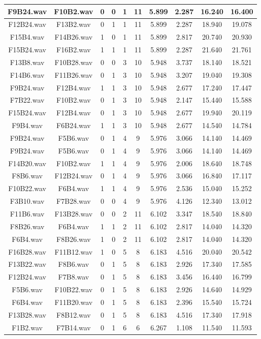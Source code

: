 \documentclass[11pt,a4paper]{book}
\begin{document}
\begin{longtable}[c]{|c|c|c|c|c|c|c|c|c|c|}
F9B24.wav&F10B2.wav&0&0&1&11&5.899&2.287&16.240&16.400\\ \hline
F12B24.wav&F13B2.wav&0&1&1&11&5.899&2.287&18.940&19.078\\ \hline
F15B4.wav&F14B26.wav&1&0&1&11&5.899&2.817&20.740&20.930\\ \hline
F15B24.wav&F16B2.wav&1&1&1&11&5.899&2.287&21.640&21.761\\ \hline
F13B8.wav&F10B28.wav&0&0&3&10&5.948&3.737&18.140&18.521\\ \hline
F14B6.wav&F11B26.wav&0&1&3&10&5.948&3.207&19.040&19.308\\ \hline
F9B24.wav&F12B4.wav&1&1&3&10&5.948&2.677&17.240&17.447\\ \hline
F7B22.wav&F10B2.wav&0&1&3&10&5.948&2.147&15.440&15.588\\ \hline
F15B24.wav&F12B4.wav&0&1&3&10&5.948&2.677&19.940&20.119\\ \hline
F9B4.wav&F6B24.wav&1&1&3&10&5.948&2.677&14.540&14.784\\ \hline
F9B24.wav&F5B6.wav&0&1&4&9&5.976&3.066&14.140&14.469\\ \hline
F9B24.wav&F5B6.wav&0&1&4&9&5.976&3.066&14.140&14.469\\ \hline
F14B20.wav&F10B2.wav&1&1&4&9&5.976&2.006&18.640&18.748\\ \hline
F8B6.wav&F12B24.wav&0&1&4&9&5.976&3.066&16.840&17.117\\ \hline
F10B22.wav&F6B4.wav&1&1&4&9&5.976&2.536&15.040&15.252\\ \hline
F3B10.wav&F7B28.wav&0&0&4&9&5.976&4.126&12.340&13.012\\ \hline
F11B6.wav&F13B28.wav&0&0&2&11&6.102&3.347&18.540&18.840\\ \hline
F8B26.wav&F6B4.wav&1&1&2&11&6.102&2.817&14.040&14.320\\ \hline
F6B4.wav&F8B26.wav&1&0&2&11&6.102&2.817&14.040&14.320\\ \hline
F16B28.wav&F11B12.wav&1&0&5&8&6.183&4.516&20.040&20.542\\ \hline
F13B22.wav&F8B6.wav&0&1&5&8&6.183&2.926&17.340&17.585\\ \hline
F12B24.wav&F7B8.wav&0&1&5&8&6.183&3.456&16.440&16.799\\ \hline
F5B6.wav&F10B22.wav&0&1&5&8&6.183&2.926&14.640&14.929\\ \hline
F6B4.wav&F11B20.wav&0&1&5&8&6.183&2.396&15.540&15.724\\ \hline
F13B28.wav&F8B12.wav&0&1&5&8&6.183&4.516&17.340&17.918\\ \hline
F1B2.wav&F7B14.wav&0&1&6&6&6.267&1.108&11.540&11.593\\ \hline

\end{longtable}
\end{document}
